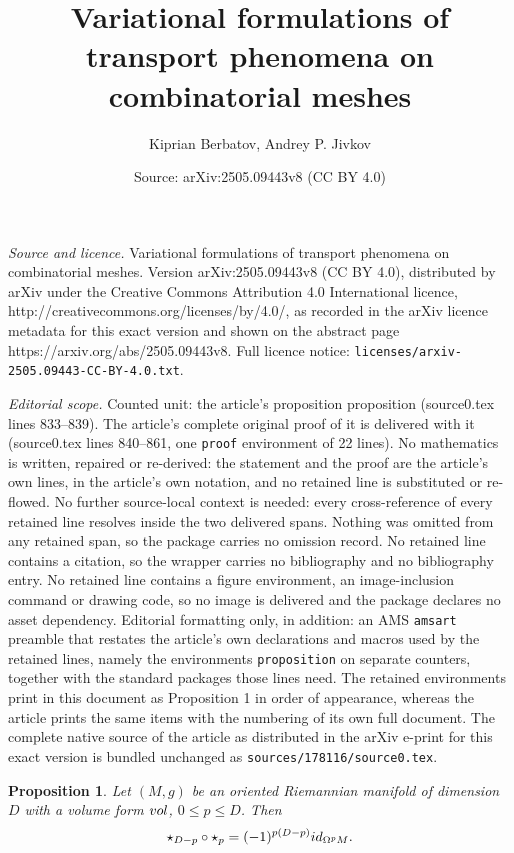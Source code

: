\documentclass[10pt,a4paper]{amsart}
\title{Variational formulations of transport phenomena on combinatorial meshes}
\author{Kiprian Berbatov, Andrey P. Jivkov}
\date{Source: arXiv:2505.09443v8 (CC BY 4.0)}
\newtheorem{proposition}{Proposition}
\newcommand{\vol}{\mathop{\rm vol}\nolimits}
\begin{document}
\maketitle

\noindent\emph{Source and licence.} Variational formulations of transport phenomena on combinatorial meshes. Version arXiv:2505.09443v8 (CC BY 4.0), distributed by arXiv under the Creative Commons Attribution 4.0 International licence, http://creativecommons.org/licenses/by/4.0/, as recorded in the arXiv licence metadata for this exact version and shown on the abstract page https://arxiv.org/abs/2505.09443v8. Full licence notice: \texttt{licenses/arxiv-2505.09443-CC-BY-4.0.txt}.\par\smallskip

\noindent\textit{Editorial scope.} Counted unit: the article's proposition proposition (source0.tex lines 833--839). The article's complete original proof of it is delivered with it (source0.tex lines 840--861, one \texttt{proof} environment of 22 lines). No mathematics is written, repaired or re-derived: the statement and the proof are the article's own lines, in the article's own notation, and no retained line is substituted or re-flowed.  No further source-local context is needed: every cross-reference of every retained line resolves inside the two delivered spans.  Nothing was omitted from any retained span, so the package carries no omission record.  No retained line contains a citation, so the wrapper carries no bibliography and no bibliography entry.  No retained line contains a figure environment, an image-inclusion command or drawing code, so no image is delivered and the package declares no asset dependency.  Editorial formatting only, in addition: an AMS \texttt{amsart} preamble that restates the article's own declarations and macros used by the retained lines, namely the environments \texttt{proposition} on separate counters, together with the standard packages those lines need.  The retained environments print in this document as Proposition 1 in order of appearance, whereas the article prints the same items with the numbering of its own full document.  The complete native source of the article as distributed in the arXiv e-print for this exact version is bundled unchanged as \texttt{sources/178116/source0.tex}.
\begin{proposition}
  Let $(M, g)$ be an oriented Riemannian manifold of dimension $D$ with a volume form $\vol$, $0 \leq p \leq D$.
  Then
  \begin{equation}
    \star_{D - p} \circ \star_p = (-1)^{p (D - p)} {\rm id}_{\Omega^p M}.
  \end{equation}
\end{proposition}
\end{document}
